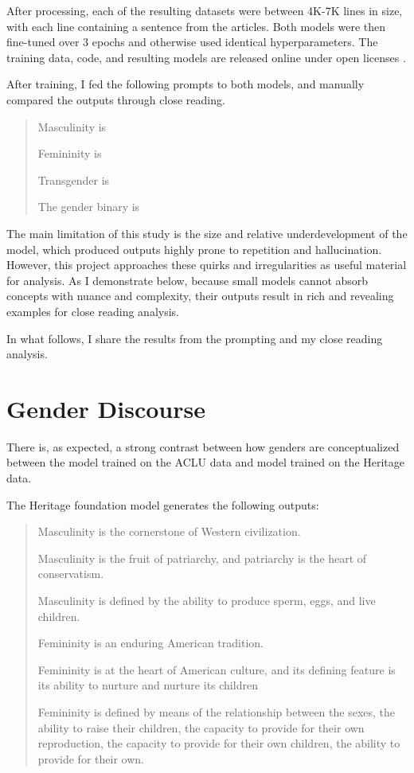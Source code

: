 \documentclass{article}
\begin{document}
After processing, each of the resulting datasets were between 4K-7K lines in size, with each line containing a sentence from the articles. Both models were then fine-tuned over 3 epochs and otherwise used identical hyperparameters. The training data, code, and resulting models are released online under open licenses \citep{anon}.

After training, I fed the following prompts to both models, and manually compared the outputs through close reading.

\begin{quote}

Masculinity is

Femininity is

Transgender is

The gender binary is

\end{quote}

The main limitation of this study is the size and relative underdevelopment of the model, which produced outputs highly prone to repetition and hallucination. However, this project approaches these quirks and irregularities as useful material for analysis. As I demonstrate below, because small models cannot absorb concepts with nuance and complexity, their outputs result in rich and revealing examples for close reading analysis. 

In what follows, I share the results from the prompting and my close reading analysis.

\section{Gender Discourse}

There is, as expected, a strong contrast between how genders are conceptualized between the model trained on the ACLU data and model trained on the Heritage data.

The Heritage foundation model generates the following outputs:

\begin{quote}

Masculinity is the cornerstone of Western civilization.

Masculinity is the fruit of patriarchy, and patriarchy is the heart
of conservatism.

Masculinity is defined by the ability to produce sperm, eggs, and live
children.

Femininity is an enduring American tradition.

Femininity is at the heart of American culture, and its defining feature is its ability to nurture and nurture its children

Femininity is defined by means of the relationship between the sexes,
the ability to raise their children, the capacity to provide for their
own reproduction, the capacity to provide for their own children, the
ability to provide for their own.

\end{quote}
\end{document}

